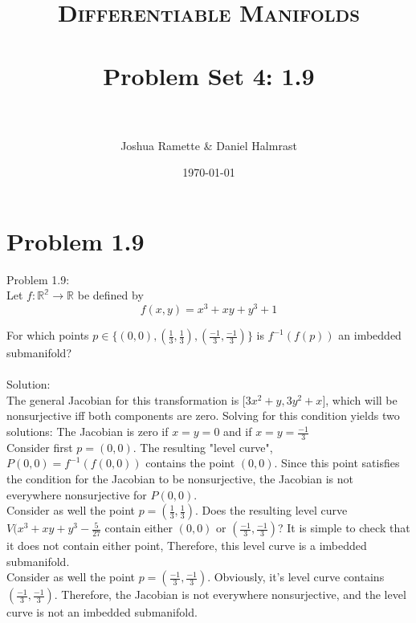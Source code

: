 \documentclass[paper=a4, fontsize=11pt]{article} %
\title{    
\normalfont \normalsize 
\textsc{Differentiable Manifolds} \\ [25pt] %
\horrule{0.5pt} \\[0.4cm] %
\huge Problem Set 4: 1.9 \\ %
\horrule{2pt} \\[0.5cm] %
}
\author{Joshua Ramette \& Daniel Halmrast} %
\date{\normalsize\today} %
\numberwithin{equation}{section} %
\numberwithin{figure}{section} %
\numberwithin{table}{section} %
\begin{document}
\maketitle %


\section*{Problem 1.9}

Problem 1.9:\\
Let $f:\mathbb{R^2} \to \mathbb{R}$ be defined by
\[
f(x,y) = x^3 + xy + y^3 + 1
\]

For which points $p \in \{(0,0),(\frac{1}{3},\frac{1}{3}),(\frac{-1}{3},\frac{-1}{3})\}$
is $f^{-1}({f(p)})$ an imbedded submanifold?\\
\\


Solution:\\
The general Jacobian for this transformation is $\big[3x^2 + y, 3y^2 + x\big]$, which will be nonsurjective
iff both components are zero.
Solving for this condition yields two solutions: The Jacobian is zero if $x=y=0$ and if $x=y=\frac{-1}{3}$\\

Consider first $p=(0,0)$. The resulting "level curve", $P(0,0)=f^{-1}({f(0,0)})$ contains the point $(0,0)$.
Since this point satisfies the condition for the Jacobian to be nonsurjective, the Jacobian is not everywhere nonsurjective 
for $P(0,0)$.\\

Consider as well the point $p=(\frac{1}{3},\frac{1}{3})$. 
Does the resulting level curve $V(x^3 + xy + y^3 - \frac{5}{27}$ contain either $(0,0)$ or $(\frac{-1}{3},\frac{-1}{3})$?
It is simple to check that it does not contain either point, Therefore, this level curve is a imbedded submanifold.\\

Consider as well the point $p=(\frac{-1}{3},\frac{-1}{3})$. 
Obviously, it's level curve contains $(\frac{-1}{3},\frac{-1}{3})$. Therefore, the Jacobian is not everywhere nonsurjective, and the level curve is not an imbedded submanifold.

\end{document}
